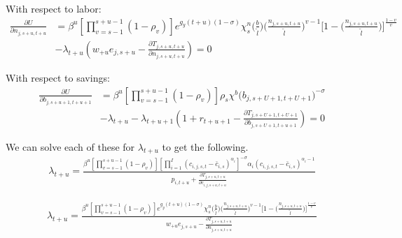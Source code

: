 \documentclass[letterpaper,11pt]{article}
\theoremstyle{definition}
\begin{document}
With respect to labor:
\begin{equation}\label{Eqnfoc}
  \begin{split}
  \frac{\partial U}{\partial n_{j,s+u,t+u}} & = \beta^u\left[\prod_{v=s-1}^{s+u-1}(1-\rho_v)\right] e^{g_y (t+u)(1-\sigma)}\chi^n_{s}\biggl(\frac{b}{\tilde{l}}\biggr)\biggl(\frac{n_{j,s+u,t+u}}{\tilde{l}}\biggr)^{v-1}\Biggl[1 - \biggl(\frac{n_{j,s+u,t+u}}{\tilde{l}}\biggr)\Biggr]^{\frac{1-v}{v}} \\
  & - \lambda_{t+u} \left( w_{+u} e_{j,s+u} - \frac{\partial T_{j,s+u,t+u}}{\partial n_{j,s+u,t+u}} \right)= 0
    \end{split}
\end{equation}

With respect to savings:
\begin{equation}\label{Eqbfoc}
  \begin{split}
  \frac{\partial U}{\partial b_{j,s+u+1,t+u+1}} & = \beta^u\left[\prod_{v=s-1}^{s+u-1}(1-\rho_v)\right] \rho_s\chi^b\bigl(b_{j,s+U+1,t+U+1}\bigr)^{-\sigma} \\
  & - \lambda_{t+u} - \lambda_{t+u+1} \left( 1 + r_{t+u+1} - \frac{\partial T_{j,s+U+1,t+U+1}}{\partial b_{j,s+U+1,t+u+1}} \right)= 0
  \end{split}
\end{equation}

We can solve each of these for $\lambda_{t+u}$ to get the following.
\begin{equation}
  \begin{split}
  \lambda_{t+u} = \frac{ \beta^u\left[\prod_{v=s-1}^{s+u-1}(1-\rho_v)\right] \left[ \prod_{i=1}^I \left( c_{i,j,s,t} - \bar c_{i,s} \right) ^{\alpha_i} \right]^{-\sigma}\alpha_i \left( c_{i,j,s,t} - \bar c_{i,s} \right)^{\alpha_i-1} } { p_{i,t+u} + \frac{\partial T_{j,s+u,t+u}}{\partial c_{i,j,s+u,t+u}} } \nonumber
  \end{split}
\end{equation}

\begin{equation}
  \begin{split}
  \lambda_{t+u} = \frac{ \beta^u\left[\prod_{v=s-1}^{s+u-1}(1-\rho_v)\right] e^{g_y (t+u)(1-\sigma)}\chi^n_{s}\biggl(\frac{b}{\tilde{l}}\biggr)\biggl(\frac{n_{j,s+u,t+u}}{\tilde{l}}\biggr)^{v-1}\Biggl[1 - \biggl(\frac{n_{j,s+u,t+u}}{\tilde{l}}\biggr)\Biggr]^{\frac{1-v}{v}} } { w_{+u} e_{j,s+u} - \frac{\partial T_{j,s+u,t+u}}{\partial n_{j,s+u,t+u}} }  \nonumber
  \end{split}
\end{equation}
\end{document}
